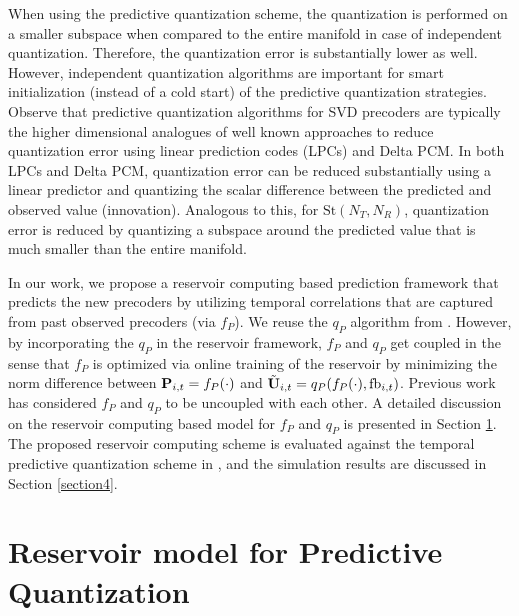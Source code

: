 \documentclass[conference]{IEEEtran}
\begin{document}
When using the predictive quantization scheme, the quantization is performed on a smaller subspace when compared to the entire manifold in case of independent quantization.
Therefore, the quantization error is substantially lower as well.
However, independent quantization algorithms are important for smart initialization (instead of a cold start) of the predictive quantization strategies.
Observe that predictive quantization algorithms for SVD precoders are typically the higher dimensional analogues of well known approaches to reduce quantization error using linear prediction codes (LPCs) and Delta PCM.
In both LPCs and Delta PCM, quantization error can be reduced substantially using a linear predictor and quantizing the scalar difference between the predicted and observed value (innovation).
Analogous to this, for $\text{St}(N_T,N_R)$, quantization error is reduced by quantizing a subspace around the predicted value that is much smaller than the entire manifold.

In our work, we propose a reservoir computing based prediction framework that predicts the new precoders by utilizing temporal correlations that are captured from past observed precoders (via $f_P$).
We reuse the $q_P$ algorithm from \cite{Gupt1905:Predictive,6891198}.
However, by incorporating the $q_P$ in the reservoir framework, $f_P$ and $q_P$ get coupled in the sense that $f_P$ is optimized via online training of the reservoir by minimizing the norm difference between ${\bf P}_{i,t}=f_P(\cdot)$ and $\tilde{{\bf U}}_{i,t}=q_P(f_P(\cdot),\text{fb}_{i,t})$.
Previous work \cite{Gupt1905:Predictive,6891198} has considered $f_P$ and $q_P$ to be uncoupled with each other.
A detailed discussion on the reservoir computing based model for $f_P$ and $q_P$ is presented in Section \ref{section3}.
The proposed reservoir computing scheme is evaluated against the temporal predictive quantization scheme in \cite{6891198}, and the simulation results are discussed in Section \ref{section4}.

\section{Reservoir model for Predictive Quantization}
\label{section3}
\end{document}
